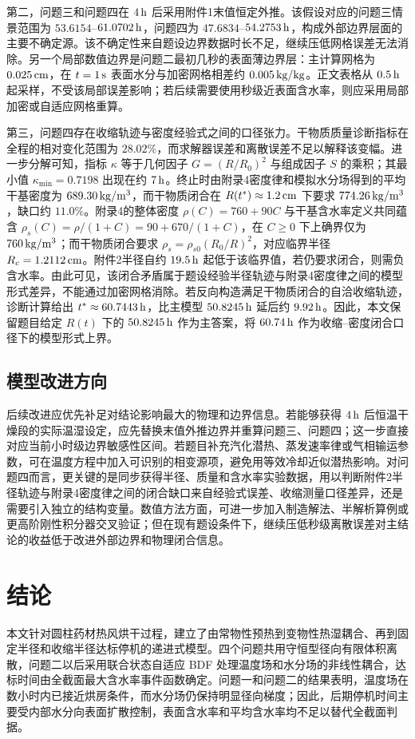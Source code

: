 \documentclass[UTF8,a4paper,12pt]{ctexart}
\numberwithin{equation}{section}
\begin{document}
第二，问题三和问题四在 $4\rm\,h$ 后采用附件1末值恒定外推。该假设对应的问题三情景范围为 $53.6154$--$61.0702\rm\,h$，问题四为 $47.6834$--$54.2753\rm\,h$，构成外部边界层面的主要不确定源。该不确定性来自题设边界数据时长不足，继续压低网格误差无法消除。另一个局部数值边界是问题二最初几秒的表面薄边界层：主计算网格为 $0.025\rm\,cm$，在 $t=1\rm\,s$ 表面水分与加密网格相差约 $0.005\rm\,kg/kg$。正文表格从 $0.5\rm\,h$ 起采样，不受该局部误差影响；若后续需要使用秒级近表面含水率，则应采用局部加密或自适应网格重算。

第三，问题四存在收缩轨迹与密度经验式之间的口径张力。干物质质量诊断指标在全程的相对变化范围为 $28.02\%$，而求解器误差和离散误差不足以解释该变幅。进一步分解可知，指标 $\kappa$ 等于几何因子 $G=(R/R_0)^2$ 与组成因子 $S$ 的乘积；其最小值 $\kappa_{\min}=0.7198$ 出现在约 $7\rm\,h$。终止时由附录4密度律和模拟水分场得到的平均干基密度为 $689.30\rm\,kg/m^3$，而干物质闭合在 $R(t^*)\approx1.2\rm\,cm$ 下要求 $774.26\rm\,kg/m^3$，缺口约 $11.0\%$。附录4的整体密度 $\rho(C)=760+90C$ 与干基含水率定义共同蕴含 $\rho_s(C)=\rho/(1+C)=90+670/(1+C)$，在 $C\ge0$ 下上确界仅为 $760\rm\,kg/m^3$；而干物质闭合要求 $\rho_s=\rho_{s0}(R_0/R)^2$，对应临界半径 $R_c=1.2112\rm\,cm$。附件2半径自约 $19.5\rm\,h$ 起低于该临界值，若仍要求闭合，则需负含水率。由此可见，该闭合矛盾属于题设经验半径轨迹与附录4密度律之间的模型形式差异，不能通过加密网格消除。若反向构造满足干物质闭合的自洽收缩轨迹，诊断计算给出 $t^*\approx60.7443\rm\,h$，比主模型 $50.8245\rm\,h$ 延后约 $9.92\rm\,h$。因此，本文保留题目给定 $R(t)$ 下的 $50.8245\rm\,h$ 作为主答案，将 $60.74\rm\,h$ 作为收缩--密度闭合口径下的模型形式上界。

\subsection{模型改进方向}
后续改进应优先补足对结论影响最大的物理和边界信息。若能够获得 $4\rm\,h$ 后恒温干燥段的实际温湿设定，应先替换末值外推边界并重算问题三、问题四；这一步直接对应当前小时级边界敏感性区间。若题目补充汽化潜热、蒸发速率律或气相输运参数，可在温度方程中加入可识别的相变源项，避免用等效冷却近似潜热影响。对问题四而言，更关键的是同步获得半径、质量和含水率实验数据，用以判断附件2半径轨迹与附录4密度律之间的闭合缺口来自经验式误差、收缩测量口径差异，还是需要引入独立的结构变量。数值方法方面，可进一步加入制造解法、半解析算例或更高阶刚性积分器交叉验证；但在现有题设条件下，继续压低秒级离散误差对主结论的收益低于改进外部边界和物理闭合信息。

\section{结论}
本文针对圆柱药材热风烘干过程，建立了由常物性预热到变物性热湿耦合、再到固定半径和收缩半径达标停机的递进式模型。四个问题共用守恒型径向有限体积离散，问题二以后采用联合状态自适应 BDF 处理温度场和水分场的非线性耦合，达标时间由全截面最大含水率事件函数确定。问题一和问题二的结果表明，温度场在数小时内已接近烘房条件，而水分场仍保持明显径向梯度；因此，后期停机时间主要受内部水分向表面扩散控制，表面含水率和平均含水率均不足以替代全截面判据。
\end{document}
